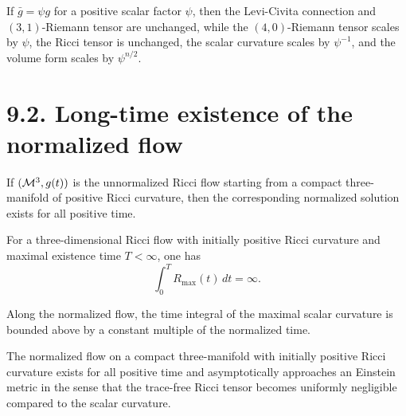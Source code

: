\begin{lemma}
\label{ch06-lem-scaling-relations}
If \(\bar g=\psi g\) for a positive scalar factor \(\psi\), then the Levi-Civita connection and \((3,1)\)-Riemann tensor are unchanged, while the \((4,0)\)-Riemann tensor scales by \(\psi\), the Ricci tensor is unchanged, the scalar curvature scales by \(\psi^{-1}\), and the volume form scales by \(\psi^{n/2}\).
\end{lemma}

\section*{9.2. Long-time existence of the normalized flow}

\begin{theorem}
\label{ch06-thm-long-time-existence-normalized-flow}
If \((\mathcal{M}^3,g(t))\) is the unnormalized Ricci flow starting from a compact three-manifold of positive Ricci curvature, then the corresponding normalized solution exists for all positive time.
\end{theorem}

\begin{lemma}
\label{ch06-lem-blowup-max-scalar-integral}
For a three-dimensional Ricci flow with initially positive Ricci curvature and maximal existence time \(T<\infty\), one has
\[
\int_0^T R_{\max}(t)\,dt=\infty.
\]
\end{lemma}

\begin{lemma}
\label{ch06-lem-uniform-upper-bound-normalized-max-scalar}
Along the normalized flow, the time integral of the maximal scalar curvature is bounded above by a constant multiple of the normalized time.
\end{lemma}

\begin{corollary}
\label{ch06-cor-asymptotic-einstein}
The normalized flow on a compact three-manifold with initially positive Ricci curvature exists for all positive time and asymptotically approaches an Einstein metric in the sense that the trace-free Ricci tensor becomes uniformly negligible compared to the scalar curvature.
\end{corollary}

